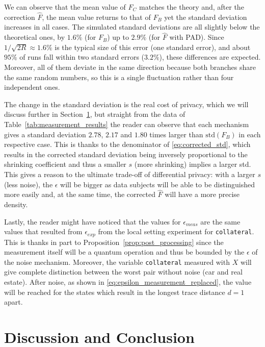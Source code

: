 \documentclass{ieeeaccess}
\begin{document}
We can observe that the mean value of $F_C$ matches the theory and, after the correction $\hat{F}$, the mean value returns to that of $F_B$ yet the standard deviation increases in all cases. The simulated standard deviations are all slightly below the theoretical ones, by $1.6\%$ (for $F_B$) up to $2.9\%$ (for $\hat{F}$ with PAD). Since $1/\sqrt{2R} \approx 1.6\%$ is the typical size of this error (one standard error), and about $95\%$ of runs fall within two standard errors ($3.2\%$), these differences are expected. Moreover, all of them deviate in the same direction because both branches share the same random numbers, so this is a single fluctuation rather than four independent ones.

The change in the standard deviation is the real cost of privacy, which we will discuss further in Section~\ref{sec:discussion_and_conclusion}, but straight from the data of Table~\ref{tab:measurement_results} the reader can observe that each mechanism gives a standard deviation $2.78$, $2.17$ and $1.80$ times larger than $\mathrm{std}(F_B)$ in each respective case. This is thanks to the denominator of \eqref{eq:corrected_std}, which results in the corrected standard deviation being inversely proportional to the shrinking coefficient and thus a smaller $s$ (more shrinking) implies a larger std. This gives a reason to the ultimate trade-off of differential privacy: with a larger $s$ (less noise), the $\epsilon$ will be bigger as data subjects will be able to be distinguished more easily and, at the same time, the corrected $\hat{F}$ will have a more precise density.

Lastly, the reader might have noticed that the values for $\epsilon_{meas}$ are the same values that resulted from $\epsilon_{exp}$ from the local setting experiment for \texttt{collateral}. This is thanks in part to Proposition~\ref{prop:post_processing} since the measurement itself will be a quantum operation and thus be bounded by the $\epsilon$ of the noise mechanism. Moreover, the variable \texttt{collateral} measured with $X$ will give complete distinction between the worst pair without noise (car and real estate). After noise, as shown in \eqref{eq:epsilon_measurement_replaced}, the value will be reached for the states which result in the longest trace distance $d=1$ apart.


\section{Discussion and Conclusion}
\label{sec:discussion_and_conclusion}
\end{document}
